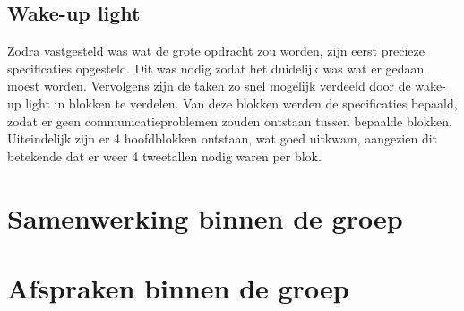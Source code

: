 \subsection{Wake-up light}
Zodra vastgesteld was wat de grote opdracht zou worden, zijn eerst precieze specificaties opgesteld. Dit was nodig zodat het duidelijk was wat er gedaan moest worden. Vervolgens zijn de taken zo snel mogelijk verdeeld door de wake-up light in blokken te verdelen. Van deze blokken werden de specificaties bepaald, zodat er geen communicatieproblemen zouden ontstaan tussen bepaalde blokken. Uiteindelijk zijn er 4 hoofdblokken ontstaan, wat goed uitkwam, aangezien dit betekende dat er weer 4 tweetallen nodig waren per blok. 

\section{Samenwerking binnen de groep}

\section{Afspraken binnen de groep}
